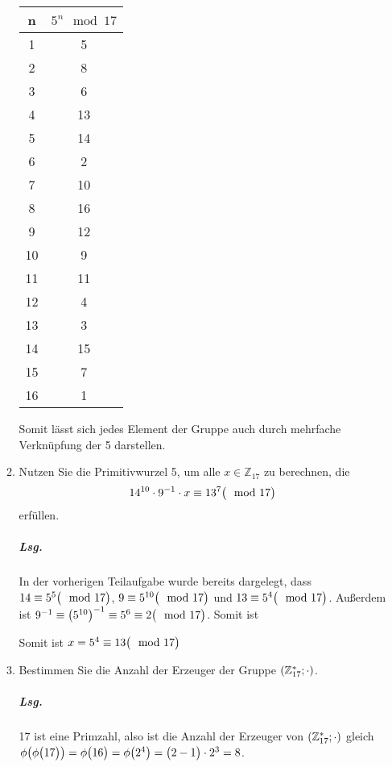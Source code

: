 \documentclass{scrreprt}
\begin{document}
\begin{enumerate}[(a)]
\begin{enumerate}[(1)]
    \begin{tabular}{c|c}
      n & $5^n \mod 17$ \\
      \hline
       1 &  5 \\
       2 &  8 \\
       3 &  6 \\
       4 & 13 \\
       5 & 14 \\
       6 &  2 \\
       7 & 10 \\
       8 & 16 \\
       9 & 12 \\
      10 &  9 \\
      11 & 11 \\
      12 &  4 \\
      13 &  3 \\
      14 & 15 \\
      15 &  7 \\
      16 &  1 \\
    \end{tabular}

    Somit lässt sich jedes Element der Gruppe auch durch mehrfache Verknüpfung
    der 5 darstellen.

  \item Nutzen Sie die Primitivwurzel 5, um alle $x \in \mathbb{Z}_{17}$ zu
    berechnen, die
    \[
      14^{10} \cdot 9^{-1} \cdot x \equiv 13^7 \qty\big(\mod 17)
    \]
    erfüllen.

    \subparagraph{Lsg.} In der vorherigen Teilaufgabe wurde bereits dargelegt,
    dass $14 \equiv 5^5 \qty\big(\mod 17)$, $9 \equiv 5^{10} \qty\big(\mod 17)$
    und $13 \equiv 5^4 \qty\big(\mod 17)$.
    Außerdem ist
    $9^{-1} \equiv \qty(5^{10})^{-1} \equiv 5^6 \equiv 2 \qty\big(\mod 17)$.
    Somit ist
    Somit ist $x = 5^4 \equiv 13 \qty\big(\mod 17)$
  \item Bestimmen Sie die Anzahl der Erzeuger der Gruppe
    $\qty(\mathbb{Z}_{17}^*; \cdot)$.

    \subparagraph{Lsg.} 17 ist eine Primzahl, also ist die Anzahl der Erzeuger
    von $\qty(\mathbb{Z}_{17}^*; \cdot)$ gleich $\phi\qty(\phi\qty\big(17))
    = \phi\qty\big(16) = \phi\qty\big(2^4) = \qty\big(2 - 1) \cdot 2^3 = 8$.
  \end{enumerate}
\end{enumerate}
\end{document}
